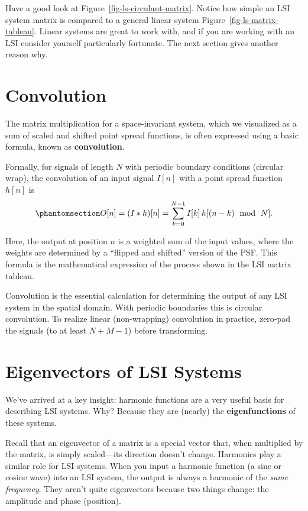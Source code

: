 \documentclass[
  letterpaper,
]{book}
\begin{document}
Have a good look at Figure~\ref{fig-ls-circulant-matrix}. Notice how
simple an LSI system matrix is compared to a general linear system
Figure~\ref{fig-ls-matrix-tableau}. Linear systems are great to work
with, and if you are working with an LSI consider yourself particularly
fortunate. The next section gives another reason why.

\section{Convolution}\label{sec-ls-convolution}

The matrix multiplication for a space-invariant system, which we
visualized as a sum of scaled and shifted point spread functions, is
often expressed using a basic formula, known as \textbf{convolution}.

Formally, for signals of length \(N\) with periodic boundary conditions
(circular wrap), the convolution of an input signal \(I[n]\) with a
point spread function \(h[n]\) is
\begin{equation}\phantomsection\label{eq-convolution-definition}{
O[n] = (I * h)[n] = \sum_{k=0}^{N-1} I[k]\,h[(n-k)\ \bmod\ N].
}\end{equation}

Here, the output at position \(n\) is a weighted sum of the input
values, where the weights are determined by a ``flipped and shifted''
version of the PSF. This formula is the mathematical expression of the
process shown in the LSI matrix tableau.

Convolution is the essential calculation for determining the output of
any LSI system in the spatial domain. With periodic boundaries this is
circular convolution. To realize linear (non-wrapping) convolution in
practice, zero‑pad the signals (to at least \(N+M-1\)) before
transforming.

\section{Eigenvectors of LSI Systems}\label{sec-ls-harmonics-LSI}

We've arrived at a key insight: harmonic functions are a very useful
basis for describing LSI systems. Why? Because they are (nearly) the
\textbf{eigenfunctions} of these systems.

Recall that an eigenvector of a matrix is a special vector that, when
multiplied by the matrix, is simply scaled---its direction doesn't
change. Harmonics play a similar role for LSI systems. When you input a
harmonic function (a sine or cosine wave) into an LSI system, the output
is always a harmonic of the \emph{same frequency}. They aren't quite
eigenvectors because two things change: the amplitude and phase
(position).
\end{document}
